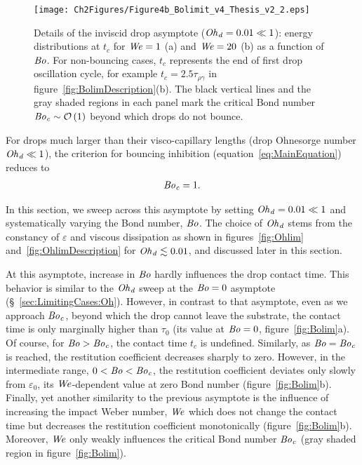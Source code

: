 \begin{figure}
	\centering
	\texttt{[image: Ch2Figures/Figure4b\_Bolimit\_v4\_Thesis\_v2\_2.eps]}
	\caption{Details of the inviscid drop asymptote ($\mathit{Oh}_\mathit{d} = 0.01 \ll 1$): energy distributions at $t_c$ for $\mathit{We} = 1$ (a) and $\mathit{We} = 20$ (b) as a function of $\mathit{Bo}$. For non-bouncing cases, $t_c$ represents the end of first drop oscillation cycle, for example $t_c = 2.5\tau_{\rho\gamma}$ in figure~\ref{fig:BolimDescription}(b). The black vertical lines and the gray shaded regions in each panel mark the critical Bond number $\mathit{Bo}_\mathit{c} \sim \mathcal{O}\left(1\right)$ beyond which drops do not bounce.}
	\label{fig:BolimDescription2}
\end{figure}

For drops much larger than their visco-capillary lengths (drop Ohnesorge number $\mathit{Oh}_\mathit{d} \ll 1$), the criterion for bouncing inhibition (equation~\eqref{eq:MainEquation}) reduces to
\begin{align}
	\mathit{Bo}_\mathit{c} = 1.
\end{align}

In this section, we sweep across this asymptote by setting $\mathit{Oh}_\mathit{d} = 0.01 \ll 1$ and systematically varying the Bond number, $\mathit{Bo}$. The choice of $\mathit{Oh}_\mathit{d}$ stems from the constancy of $\varepsilon$ and viscous dissipation as shown in figures~\ref{fig:Ohlim} and~\ref{fig:OhlimDescription} for $\mathit{Oh}_\mathit{d} \lesssim 0.01$, and discussed later in this section.

At this asymptote, increase in $\mathit{Bo}$ hardly influences the drop contact time. This behavior is similar to the $\mathit{Oh}_\mathit{d}$ sweep at the $\mathit{Bo} = 0$ asymptote (\S~\ref{sec:LimitingCases:Oh}). However, in contrast to that asymptote, even as we approach $\mathit{Bo}_\mathit{c}$, beyond which the drop cannot leave the substrate, the contact time is only marginally higher than $\tau_0$ (its value at $\mathit{Bo} = 0$, figure~\ref{fig:Bolim}a). 
Of course, for $\mathit{Bo} > \mathit{Bo}_\mathit{c}$, the contact time $t_c$ is undefined. Similarly, as $\mathit{Bo} = \mathit{Bo}_\mathit{c}$ is reached, the restitution coefficient decreases sharply to zero. However, in the intermediate range, $0 < \mathit{Bo} < \mathit{Bo}_\mathit{c}$, the restitution coefficient deviates only slowly from $\varepsilon_0$, its $\mathit{We}$-dependent value at zero Bond number (figure~\ref{fig:Bolim}b). 
Finally, yet another similarity to the previous asymptote is the influence of increasing the impact Weber number, $\mathit{We}$ which does not change the contact time but decreases the restitution coefficient monotonically (figure~\ref{fig:Bolim}b). Moreover, $\mathit{We}$ only weakly influences the critical Bond number $\mathit{Bo}_\mathit{c}$ (gray shaded region in figure~\ref{fig:Bolim}).

